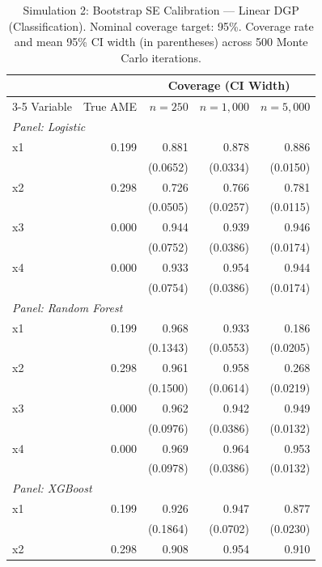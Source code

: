 \documentclass[12pt,a4paper]{article}
\numberwithin{equation}{section}
\theoremstyle{plain}
\theoremstyle{definition}
\begin{document}
	\begin{table}[htbp]
		\centering
		\footnotesize
		\begin{threeparttable}
			\caption{Simulation 2: Bootstrap SE Calibration --- Linear DGP (Classification). Nominal coverage target: 95\%. Coverage rate and mean 95\% CI width (in parentheses) across 500 Monte Carlo iterations.}
			\label{tab:sim2_calibration_linear}
			\begin{tabular}{lrrrr}
				\toprule
				& & \multicolumn{3}{c}{Coverage (CI Width)} \\
				\cmidrule(lr){3-5}
				Variable & True AME & $n=250$ & $n=1,000$ & $n=5,000$ \\
				\midrule
				\multicolumn{5}{l}{\textit{Panel: Logistic}} \\
				\quad x1 & 0.199 & 0.881 & 0.878 & 0.886 \\
				&  & (0.0652) & (0.0334) & (0.0150) \\
				\quad x2 & 0.298 & 0.726 & 0.766 & 0.781 \\
				&  & (0.0505) & (0.0257) & (0.0115) \\
				\quad x3 & 0.000 & 0.944 & 0.939 & 0.946 \\
				&  & (0.0752) & (0.0386) & (0.0174) \\
				\quad x4 & 0.000 & 0.933 & 0.954 & 0.944 \\
				&  & (0.0754) & (0.0386) & (0.0174) \\
				\midrule
				\multicolumn{5}{l}{\textit{Panel: Random Forest}} \\
				\quad x1 & 0.199 & 0.968 & 0.933 & 0.186 \\
				&  & (0.1343) & (0.0553) & (0.0205) \\
				\quad x2 & 0.298 & 0.961 & 0.958 & 0.268 \\
				&  & (0.1500) & (0.0614) & (0.0219) \\
				\quad x3 & 0.000 & 0.962 & 0.942 & 0.949 \\
				&  & (0.0976) & (0.0386) & (0.0132) \\
				\quad x4 & 0.000 & 0.969 & 0.964 & 0.953 \\
				&  & (0.0978) & (0.0386) & (0.0132) \\
				\midrule
				\multicolumn{5}{l}{\textit{Panel: XGBoost}} \\
				\quad x1 & 0.199 & 0.926 & 0.947 & 0.877 \\
				&  & (0.1864) & (0.0702) & (0.0230) \\
				\quad x2 & 0.298 & 0.908 & 0.954 & 0.910 \\

\end{tabular}
\end{threeparttable}
\end{table}
\end{document}
